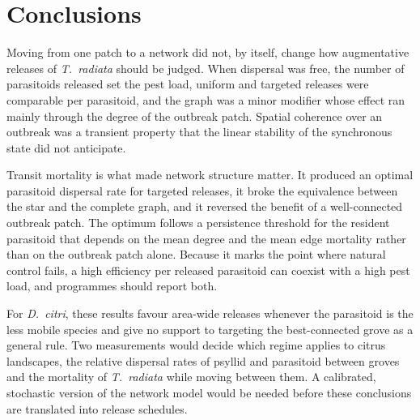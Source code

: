 
\section{Conclusions}
\label{sec:conclusions}

Moving from one patch to a network did not, by itself, change how augmentative releases of \textit{T.~radiata} should be judged. When dispersal was free, the number of parasitoids released set the pest load, uniform and targeted releases were comparable per parasitoid, and the graph was a minor modifier whose effect ran mainly through the degree of the outbreak patch. Spatial coherence over an outbreak was a transient property that the linear stability of the synchronous state did not anticipate.

Transit mortality is what made network structure matter. It produced an optimal parasitoid dispersal rate for targeted releases, it broke the equivalence between the star and the complete graph, and it reversed the benefit of a well-connected outbreak patch. The optimum follows a persistence threshold for the resident parasitoid that depends on the mean degree and the mean edge mortality rather than on the outbreak patch alone. Because it marks the point where natural control fails, a high efficiency per released parasitoid can coexist with a high pest load, and programmes should report both.

For \textit{D.~citri}, these results favour area-wide releases whenever the parasitoid is the less mobile species and give no support to targeting the best-connected grove as a general rule. Two measurements would decide which regime applies to citrus landscapes, the relative dispersal rates of psyllid and parasitoid between groves and the mortality of \textit{T.~radiata} while moving between them. A calibrated, stochastic version of the network model would be needed before these conclusions are translated into release schedules.
